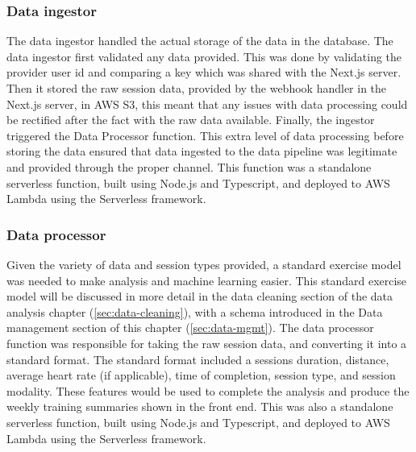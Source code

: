 \subsubsection{Data ingestor}
The data ingestor handled the actual storage of the data in the database. The data ingestor first validated any data provided. This was done by validating the provider user id and comparing a key which was shared with the Next.js server. Then it stored the raw session data, provided by the webhook handler in the Next.js server, in AWS S3, this meant that any issues with data processing could be rectified after the fact with the raw data available. Finally, the ingestor triggered the Data Processor function. This extra level of data processing before storing the data ensured that data ingested to the data pipeline was legitimate and provided through the proper channel. This function was a standalone serverless function, built using Node.js and Typescript, and deployed to AWS Lambda using the Serverless framework.

\subsubsection{Data processor}
Given the variety of data and session types provided, a standard exercise model was needed to make analysis and machine learning easier. This standard exercise model will be discussed in more detail in the data cleaning section of the data analysis chapter (\ref{sec:data-cleaning}), with a schema introduced in the Data management section of this chapter (\ref{sec:data-mgmt}). The data processor function was responsible for taking the raw session data, and converting it into a standard format. The standard format included a sessions duration, distance, average heart rate (if applicable), time of completion, session type, and session modality. These features would be used to complete the analysis and produce the weekly training summaries shown in the front end. This was also a standalone serverless function, built using Node.js and Typescript, and deployed to AWS Lambda using the Serverless framework.

